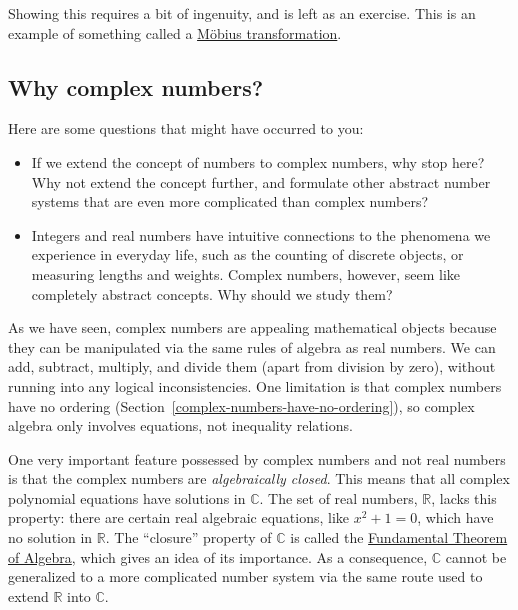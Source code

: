 \documentclass[10pt,a4paper]{article}
\begin{document}
\noindent
Showing this requires a bit of ingenuity, and is left as an
exercise. This is an example of something called a
\href{http://en.wikipedia.org/wiki/M\%C3\%B6bius_transformation}{Möbius
  transformation}.

\subsection{Why complex numbers?}\label{why-complex-numbers}

Here are some questions that might have occurred to you:

\begin{itemize}
\item
  If we extend the concept of numbers to complex numbers, why stop here?
  Why not extend the concept further, and formulate other abstract
  number systems that are even more complicated than complex numbers?
\item
  Integers and real numbers have intuitive connections to the phenomena
  we experience in everyday life, such as the counting of discrete
  objects, or measuring lengths and weights. Complex numbers, however,
  seem like completely abstract concepts. Why should we study them?
\end{itemize}

As we have seen, complex numbers are appealing mathematical objects
because they can be manipulated via the same rules of algebra as real
numbers. We can add, subtract, multiply, and divide them (apart from
division by zero), without running into any logical
inconsistencies. One limitation is that complex numbers have no
ordering (Section~\ref{complex-numbers-have-no-ordering}), so complex
algebra only involves equations, not inequality relations.

One very important feature possessed by complex numbers and not real
numbers is that the complex numbers are \emph{algebraically closed}.
This means that all complex polynomial equations have solutions in
$\mathbb{C}$. The set of real numbers, $\mathbb{R}$, lacks this
property: there are certain real algebraic equations, like
$x^2 + 1 = 0$, which have no solution in $\mathbb{R}$. The
``closure'' property of $\mathbb{C}$ is called the
\href{https://en.wikipedia.org/wiki/Fundamental_theorem_of_algebra}{Fundamental
Theorem of Algebra}, which gives an idea of its importance. As a
consequence, $\mathbb{C}$ cannot be generalized to a more complicated
number system via the same route used to extend $\mathbb{R}$ into
$\mathbb{C}$.
\end{document}
